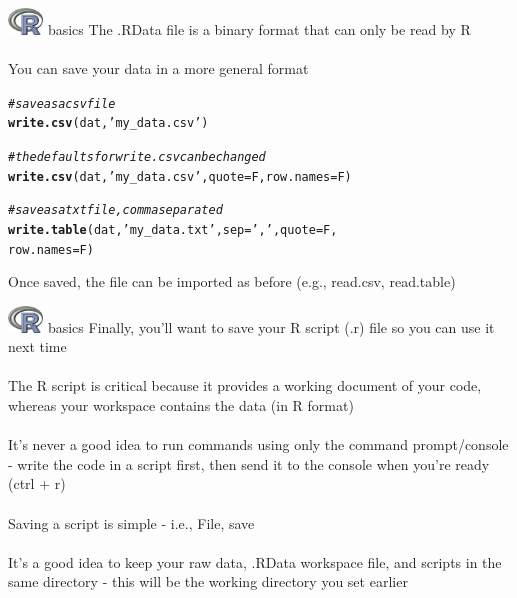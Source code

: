 \documentclass[xcolor=svgnames]{beamer}\usepackage[]{graphicx}\usepackage[]{color}
\makeatletter
\newcommand{\hlstr}[1]{\textcolor[rgb]{0.192,0.494,0.8}{#1}}%
\newcommand{\hlcom}[1]{\textcolor[rgb]{0.678,0.584,0.686}{\textit{#1}}}%
\newcommand{\hlstd}[1]{\textcolor[rgb]{0.345,0.345,0.345}{#1}}%
\newcommand{\hlkwc}[1]{\textcolor[rgb]{0.333,0.667,0.333}{#1}}%
\newcommand{\hlkwd}[1]{\textcolor[rgb]{0.737,0.353,0.396}{\textbf{#1}}}%
\newenvironment{kframe}{%
 \def\at@end@of@kframe{}%
 \ifinner\ifhmode%
  \def\at@end@of@kframe{\end{minipage}}%
  \begin{minipage}{\columnwidth}%
 \fi\fi%
 \def\FrameCommand##1{\hskip\@totalleftmargin \hskip-\fboxsep
 \colorbox{shadecolor}{##1}\hskip-\fboxsep
     \hskip-\linewidth \hskip-\@totalleftmargin \hskip\columnwidth}%
 \MakeFramed {\advance\hsize-\width
   \@totalleftmargin\z@ \linewidth\hsize
   \@setminipage}}%
 {\par\unskip\endMakeFramed%
 \at@end@of@kframe}
\newenvironment{knitrout}{}{} %
\makeatother
\begin{document}
\begin{frame}[t,fragile]{\includegraphics[width=0.07\textwidth]{Rlogo.jpg} \hspace{0.01in} basics}
The .RData file is a binary format that can only be read by R\\~\\
You can save your data in a more general format 
\begin{knitrout}\scriptsize
{}\color{fgcolor}\begin{kframe}
\begin{alltt}
\hlcom{# save as a csv file}
\hlkwd{write.csv}\hlstd{(dat,} \hlstr{'my_data.csv'}\hlstd{)}

\hlcom{# the defaults for write.csv can be changed}
\hlkwd{write.csv}\hlstd{(dat,} \hlstr{'my_data.csv'}\hlstd{,} \hlkwc{quote} \hlstd{= F,} \hlkwc{row.names} \hlstd{= F)}

\hlcom{# save as a txt file, comma separated}
\hlkwd{write.table}\hlstd{(dat,} \hlstr{'my_data.txt'}\hlstd{,} \hlkwc{sep} \hlstd{=} \hlstr{','}\hlstd{,} \hlkwc{quote} \hlstd{= F,}
  \hlkwc{row.names} \hlstd{= F)}
\end{alltt}
\end{kframe}
\end{knitrout}
Once saved, the file can be imported as before (e.g., read.csv, read.table)
\end{frame}

\begin{frame}[t,fragile]{\includegraphics[width=0.07\textwidth]{Rlogo.jpg} \hspace{0.01in} basics}
Finally, you'll want to save your R script (.r) file so you can use it next time \\~\\
The R script is critical because it provides a working document of your code, whereas your workspace contains the data (in R format)\\~\\
It's never a good idea to run commands using only the command prompt/console - write the code in a script first, then send it to the console when you're ready (ctrl + r) \\~\\
Saving a script is simple - i.e., File, save \\~\\
It's a good idea to keep your raw data, .RData workspace file, and scripts in the same directory - this will be the working directory you set earlier
\end{frame}
\end{document}
